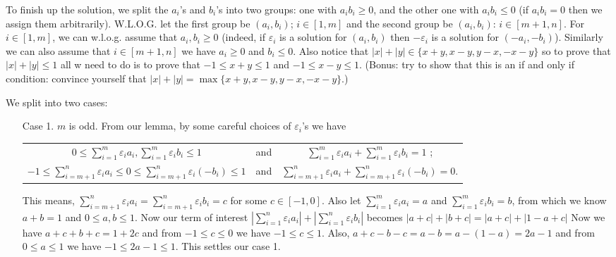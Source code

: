\documentclass[11pt,a4paper]{article}
\begin{document}
\begin{itemize}
To finish up the solution, 
we split the $a_i$'s and $b_i$'s into two groups: 
one with $a_ib_i\ge 0$, and the other one with $a_ib_i\le 0$ (if $a_ib_i=0$ then we assign them arbitrarily). 
W.L.O.G. let the first group be 
$(a_i, b_i)$; $i\in [1, m]$ and the second group be $(a_i, b_i)$: $i\in [m+1, n]$. 
For $i\in [1, m]$, we can w.l.o.g. assume that $a_i, b_i\ge 0$ (indeed, if $\varepsilon_i$ is a solution for $(a_i, b_i)$ then $-\varepsilon_i$ is a solution for $(-a_i, -b_i)$). 
Similarly we can also assume that $i\in [m+1, n]$ we have $a_i\ge 0$ and $b_i\le 0$. 
Also notice that $|x|+|y|\in \{x+y, x-y, y-x, -x-y\}$ 
so to prove that $|x|+|y|\le 1$ all w need to do is to prove that $-1\le x+y\le 1$ and $-1\le x-y\le 1$. 
(Bonus: try to show that this is an if and only if condition: convince yourself that $|x|+|y|=\max \{x+y, x-y, y-x, -x-y\}$.)

We split into two cases: 
\begin{itemize}
\item [Case 1.] $m$ is odd. 
From our lemma, by some careful choices of $\varepsilon_i$'s we have 
\begin{center}
\begin{tabular}{c c c} 
$0\le \sum_{i=1}^m \varepsilon_i a_i, \sum_{i=1}^m \varepsilon_i b_i\le 1$
& and & $\sum_{i=1}^m \varepsilon_i a_i +\sum_{i=1}^m \varepsilon_i b_i=1$ ; \\ 
$-1\le \sum_{i=m+1}^n \varepsilon_i a_i\le 0\le \sum_{i=m+1}^n \varepsilon_i (-b_i)\le 1$
& and & $\sum_{i=m+1}^n \varepsilon_i a_i +\sum_{i=m+1}^n \varepsilon_i (-b_i)=0$. \\ 
\end{tabular} 
\end{center}
This means, $\sum_{i=m+1}^n \varepsilon_i a_i=\sum_{i=m+1}^n \varepsilon_i b_i=c$ for some $c\in [-1, 0]$. 
Also let $\sum_{i=1}^m \varepsilon_i a_i=a$ and $\sum_{i=1}^m \varepsilon_i b_i=b$, from which we know 
$a+b=1$ and $0\le a, b\le 1$. 
Now our term of interest $\left| \sum_{i=1}^n \varepsilon_i a_i \right| + \left| \sum_{i=1}^n \varepsilon_i b_i \right|$ becomes $|a+c|+|b+c|=|a+c|+|1-a+c|$
Now we have 
$a+c+b+c=1+2c$ and from $-1\le c\le 0$ we have $-1\le c\le 1$. 
Also, $a+c-b-c=a-b=a-(1-a)=2a-1$ and from $0\le a\le 1$ we have $-1\le 2a-1\le 1$. 
This settles our case 1. 


\end{itemize}
\end{itemize}
\end{document}
